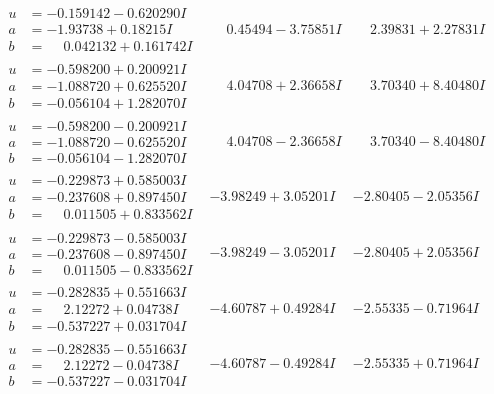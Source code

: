 \documentclass[1p]{elsarticle_modified}
\theoremstyle{definition}
\begin{document}
$$\begin{array}{c|c|c}
\begin{aligned}
u &= -0.159142 - 0.620290 I \\
a &= -1.93738 + 0.18215 I \\
b &= \phantom{-}0.042132 + 0.161742 I\end{aligned}
 & \phantom{-}0.45494 - 3.75851 I & \phantom{-}2.39831 + 2.27831 I \\ \hline\begin{aligned}
u &= -0.598200 + 0.200921 I \\
a &= -1.088720 + 0.625520 I \\
b &= -0.056104 + 1.282070 I\end{aligned}
 & \phantom{-}4.04708 + 2.36658 I & \phantom{-}3.70340 + 8.40480 I \\ \hline\begin{aligned}
u &= -0.598200 - 0.200921 I \\
a &= -1.088720 - 0.625520 I \\
b &= -0.056104 - 1.282070 I\end{aligned}
 & \phantom{-}4.04708 - 2.36658 I & \phantom{-}3.70340 - 8.40480 I \\ \hline\begin{aligned}
u &= -0.229873 + 0.585003 I \\
a &= -0.237608 + 0.897450 I \\
b &= \phantom{-}0.011505 + 0.833562 I\end{aligned}
 & -3.98249 + 3.05201 I & -2.80405 - 2.05356 I \\ \hline\begin{aligned}
u &= -0.229873 - 0.585003 I \\
a &= -0.237608 - 0.897450 I \\
b &= \phantom{-}0.011505 - 0.833562 I\end{aligned}
 & -3.98249 - 3.05201 I & -2.80405 + 2.05356 I \\ \hline\begin{aligned}
u &= -0.282835 + 0.551663 I \\
a &= \phantom{-}2.12272 + 0.04738 I \\
b &= -0.537227 + 0.031704 I\end{aligned}
 & -4.60787 + 0.49284 I & -2.55335 - 0.71964 I \\ \hline\begin{aligned}
u &= -0.282835 - 0.551663 I \\
a &= \phantom{-}2.12272 - 0.04738 I \\
b &= -0.537227 - 0.031704 I\end{aligned}
 & -4.60787 - 0.49284 I & -2.55335 + 0.71964 I \\ \hline\begin{aligned}

\end{aligned}
\end{array}$$
\end{document}
